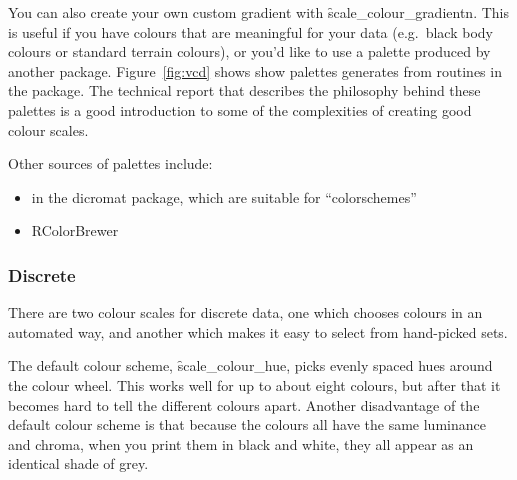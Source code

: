 
You can also create your own custom gradient with \f{scale_colour_gradientn}.  This is useful if you have colours that are meaningful for your data (e.g.\ black body colours or standard terrain colours), or you'd like to use a palette produced by another package.  Figure~\ref{fig:vcd} shows show palettes generates from routines in the  package.  The technical report \citet{zeileis:2007} that describes the philosophy behind these palettes is a good introduction to some of the complexities of creating good colour scales.

Other sources of palettes include:

\begin{itemize}
  \item {} in the dicromat package, which are suitable for ``colorschemes''
  \item RColorBrewer
\end{itemize}

% 


\subsubsection{Discrete}
\label{ssub:colour-discrete}

There are two colour scales for discrete data, one which chooses colours in an automated way, and another which makes it easy to select from hand-picked sets.

The default colour scheme, \f{scale_colour_hue}, picks evenly spaced hues around the colour wheel.  This works well for up to about eight colours, but after that it becomes hard to tell the different colours apart.  Another disadvantage of the default colour scheme is that because the colours all have the same luminance and chroma, when you print them in black and white, they all appear as an identical shade of grey.

